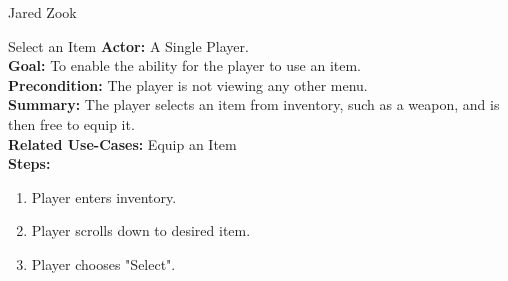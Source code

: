 \documentclass[12pt]{report}
\begin{document}
\begin{section}{Jared Zook}
\begin{subsection}{Select an Item}
\textbf{Actor:} A Single Player. \\
\textbf{Goal:} To enable the ability for the player to use an item. \\
\textbf{Precondition:} The player is not viewing any other menu. \\
\textbf{Summary:} The player selects an item from inventory, such as a weapon, and is then free to equip it. \\
\textbf{Related Use-Cases:} Equip an Item \\
\textbf{Steps:}
\begin{enumerate}
   \item Player enters inventory.
   \item Player scrolls down to desired item.
   \item Player chooses "Select".
\end{enumerate}
\end{subsection}

\end{section}
\end{document}
